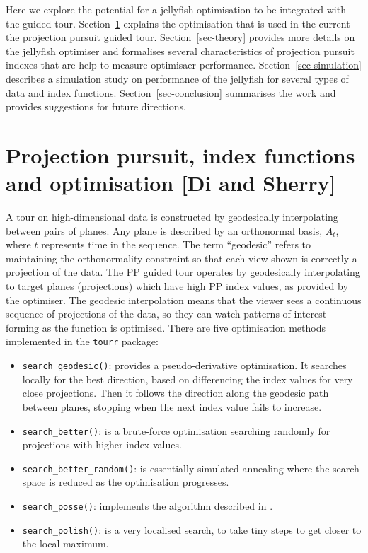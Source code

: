 \documentclass[
  number,
  preprint,
  3p]{elsarticle}
\providecommand{\tightlist}{%
  \setlength{\itemsep}{0pt}\setlength{\parskip}{0pt}}\usepackage{longtable,booktabs,array}
\begin{document}
Here we explore the potential for a jellyfish optimisation to be
integrated with the guided tour. Section~\ref{sec-background} explains
the optimisation that is used in the current the projection pursuit
guided tour. Section~\ref{sec-theory} provides more details on the
jellyfish optimiser and formalises several characteristics of projection
pursuit indexes that are help to measure optimisaer performance.
Section~\ref{sec-simulation} describes a simulation study on performance
of the jellyfish for several types of data and index functions.
Section~\ref{sec-conclusion} summarises the work and provides
suggestions for future directions.

\section{Projection pursuit, index functions and optimisation {[}Di and
Sherry{]}}\label{sec-background}

A tour on high-dimensional data is constructed by geodesically
interpolating between pairs of planes. Any plane is described by an
orthonormal basis, \(A_t\), where \(t\) represents time in the sequence.
The term ``geodesic'' refers to maintaining the orthonormality
constraint so that each view shown is correctly a projection of the
data. The PP guided tour operates by geodesically interpolating to
target planes (projections) which have high PP index values, as provided
by the optimiser. The geodesic interpolation means that the viewer sees
a continuous sequence of projections of the data, so they can watch
patterns of interest forming as the function is optimised. There are
five optimisation methods implemented in the \texttt{tourr} package:

\begin{itemize}
\tightlist
\item
  \texttt{search\_geodesic()}: provides a pseudo-derivative
  optimisation. It searches locally for the best direction, based on
  differencing the index values for very close projections. Then it
  follows the direction along the geodesic path between planes, stopping
  when the next index value fails to increase.
\item
  \texttt{search\_better()}: is a brute-force optimisation searching
  randomly for projections with higher index values.
\item
  \texttt{search\_better\_random()}: is essentially simulated annealing
  \citep{Bertsimas93} where the search space is reduced as the
  optimisation progresses.
\item
  \texttt{search\_posse()}: implements the algorithm described in
  \citet{posse95}.
\item
  \texttt{search\_polish()}: is a very localised search, to take tiny
  steps to get closer to the local maximum.
\end{itemize}
\end{document}
